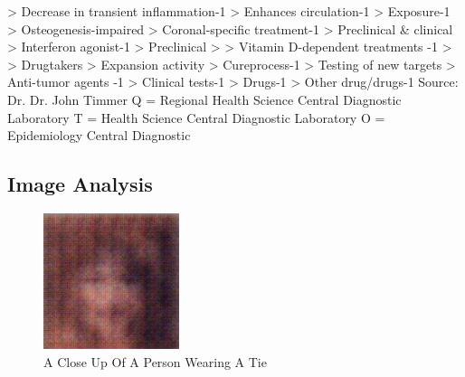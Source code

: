 \documentclass{article}%
\begin{document}
> Decrease in transient inflammation{-}1\newline%
> Enhances circulation{-}1\newline%
> Exposure{-}1\newline%
> Osteogenesis{-}impaired\newline%
> Coronal{-}specific treatment{-}1\newline%
> Preclinical \& clinical\newline%
> Interferon agonist{-}1\newline%
> Preclinical\newline%
>\newline%
> Vitamin D{-}dependent treatments {-}1\newline%
>\newline%
> Drugtakers\newline%
> Expansion activity\newline%
> Cureprocess{-}1\newline%
> Testing of new targets\newline%
> Anti{-}tumor agents {-}1\newline%
> Clinical tests{-}1\newline%
> Drugs{-}1\newline%
> Other drug/drugs{-}1\newline%
Source: Dr.\newline%
Dr. John Timmer\newline%
Q = Regional Health Science Central Diagnostic Laboratory\newline%
T = Health Science Central Diagnostic Laboratory\newline%
O = Epidemiology Central Diagnostic

%
\subsection{Image Analysis}%
\label{subsec:ImageAnalysis}%


\begin{figure}[h!]%
\centering%
\includegraphics[width=150px]{500_fake_images/samples_5_340.png}%
\caption{A Close Up Of A Person Wearing A Tie}%
\end{figure}

%
\end{document}
